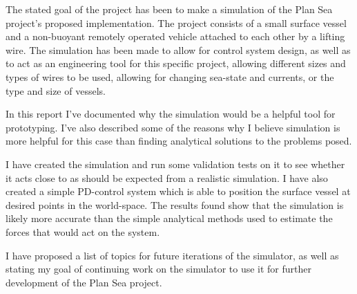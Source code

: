 The stated goal of the project has been to make a simulation of the Plan Sea project's proposed implementation. The project consists of a small surface vessel and a non-buoyant remotely operated vehicle attached to each other by a lifting wire. The simulation has been made to allow for control system design, as well as to act as an engineering tool for this specific project, allowing different sizes and types of wires to be used, allowing for changing sea-state and currents, or the type and size of vessels. 

In this report I've documented why the simulation would be a helpful tool for prototyping. I've also described some of the reasons why I believe simulation is more helpful for this case than finding analytical solutions to the problems posed. 

I have created the simulation and run some validation tests on it to see whether it acts close to as should be expected from a realistic simulation. I have also created a simple PD-control system which is able to position the surface vessel at desired points in the world-space. The results found show that the simulation is likely more accurate than the simple analytical methods used to estimate the forces that would act on the system. 

I have proposed a list of topics for future iterations of the simulator, as well as stating my goal of continuing work on the simulator to use it for further development of the Plan Sea project. 

